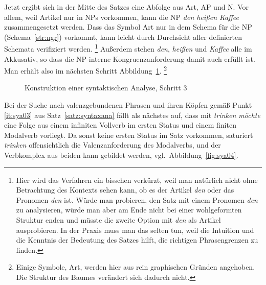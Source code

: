 Jetzt ergibt sich in der Mitte des Satzes eine Abfolge aus Art, AP und N.
Vor allem, weil Artikel nur in NPs vorkommen, kann die NP \textit{den heißen Kaffee} zusammengesetzt werden.
Dass das Symbol Art nur in dem Schema für die NP (Schema~\ref{str:ngr}) vorkommt, kann leicht durch Durchsicht aller definierten Schemata verifiziert werden.%
\footnote{Hier wird das Verfahren ein bisschen verkürzt, weil man natürlich nicht ohne Betrachtung des Kontexts sehen kann, ob es der Artikel \textit{den} oder das Pronomen \textit{den} ist.
Würde man probieren, den Satz mit einem Pronomen \textit{den} zu analysieren, würde man aber am Ende nicht bei einer wohlgeformten Struktur enden und müsste die zweite Option mit \textit{den} als Artikel ausprobieren.
In der Praxis muss man das selten tun, weil die Intuition und die Kenntnis der Bedeutung des Satzes hilft, die richtigen Phrasengrenzen zu finden.}
Außerdem stehen \textit{den}, \textit{heißen} und \textit{Kaffee} alle im Akkusativ, so dass die NP-interne Kongruenzanforderung damit  auch erfüllt ist.
Man erhält also im nächsten Schritt Abbildung~\ref{fig:sya03}.%
\footnote{Einige Symbole, \zB Art, werden hier aus rein graphischen Gründen angehoben.
Die Struktur des Baumes verändert sich dadurch nicht.}

\begin{figure}[!htbp]
  \caption{Konstruktion einer syntaktischen Analyse, Schritt 3}
  \label{fig:sya03}
\end{figure}

Bei der Suche nach valenzgebundenen Phrasen und ihren Köpfen gemäß Punkt \ref{it:sya03} aus Satz~\ref{satz:syntaxana} fällt als nächstes auf, dass mit \textit{trinken möchte} eine Folge aus einem infiniten Vollverb im ersten Status und einem finiten Modalverb vorliegt.
Da sonst keine ersten Status im Satz vorkommen, saturiert \textit{trinken} offensichtlich die Valenzanforderung des Modalverbs, und der Verbkomplex aus beiden kann gebildet werden, vgl.\ Abbildung~\ref{fig:sya04}.

